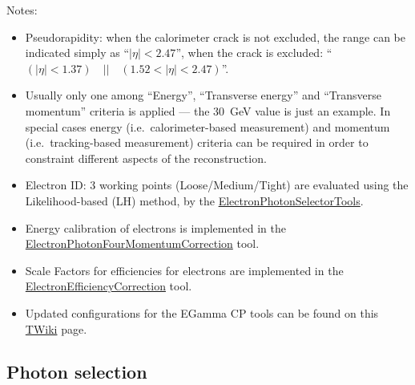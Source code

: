 Notes:
\begin{itemize}
\item Pseudorapidity: when the calorimeter crack is not excluded, the range can be indicated simply as \enquote{\(|\eta| < 2.47\)}, when the crack is excluded: \enquote{\((|\eta| < 1.37) \quad || \quad (1.52 < |\eta| < 2.47)\)}.
\item Usually only one among \enquote{Energy}, \enquote{Transverse energy} and \enquote{Transverse momentum} criteria is applied --- the \SI{30}{\GeV} value is just an example.
  In special cases energy (i.e.\ calorimeter-based measurement) and momentum (i.e.\ tracking-based measurement) criteria can be required in order to constraint different aspects of the reconstruction.
\item Electron ID\@: 3 working points (Loose/Medium/Tight) are evaluated using the Likelihood-based (LH) method, by the
  \href{https://twiki.cern.ch/twiki/bin/view/AtlasProtected/EGammaIdentificationRun2}{ElectronPhotonSelectorTools}.
\item Energy calibration of electrons is implemented in the\\
  \href{https://twiki.cern.ch/twiki/bin/view/AtlasProtected/ElectronPhotonFourMomentumCorrection}{ElectronPhotonFourMomentumCorrection} tool.
\item Scale Factors for efficiencies for electrons are implemented in the\\
  \href{https://twiki.cern.ch/twiki/bin/view/AtlasProtected/XAODElectronEfficiencyCorrectionTool}{ElectronEfficiencyCorrection} tool.
\item Updated configurations for the EGamma CP tools can be found on this \href{https://twiki.cern.ch/twiki/bin/view/AtlasProtected/EGammaRecommendationsR21}{TWiki} page.
\end{itemize}

\newpage

\subsection{Photon selection}

